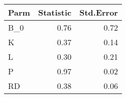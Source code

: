 \begin{tabular}{lrr}
  \hline
Parm & Statistic & Std.Error \\ 
  \hline
B\_0 & 0.76 & 0.72 \\ 
  K & 0.37 & 0.14 \\ 
  L & 0.30 & 0.21 \\ 
  P & 0.97 & 0.02 \\ 
  RD & 0.38 & 0.06 \\ 
   \hline
\end{tabular}
